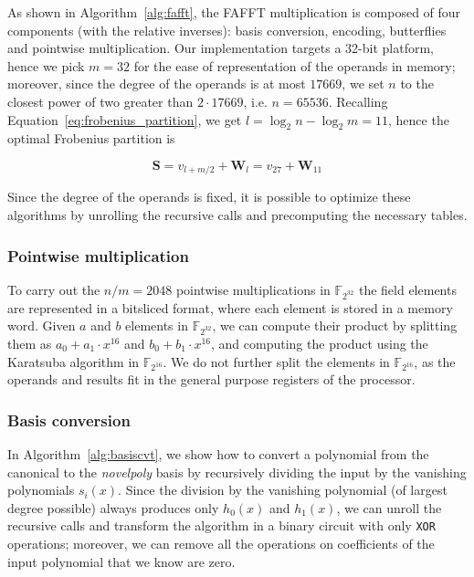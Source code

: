         As shown in Algorithm~\ref{alg:fafft}, the FAFFT multiplication is composed of four components (with the relative inverses): basis conversion, encoding, butterflies and
        pointwise multiplication.
        Our implementation targets a 32-bit platform, hence we pick $m=32$ for the ease of representation of the operands in memory; moreover,
        since the degree of the operands is at most $17669$, we set $n$ to the closest power of two greater than $2\cdot 17669$, i.e. $n=65536$.
        Recalling Equation~\ref{eq:frobenius_partition}, we get $l = \log_2{n}-\log_2{m} = 11$, hence the optimal Frobenius partition is
        
        \begin{equation*}
            \mathbf{S} = v_{l+m/2} + \mathbf{W}_l = v_{27} + \mathbf{W}_{11}
        \end{equation*}
        
        Since the degree of the operands is fixed, it is possible to optimize these algorithms by unrolling the recursive calls and precomputing the necessary tables.

    \subsubsection{Pointwise multiplication}
        To carry out the $n/m=2048$ pointwise multiplications in $\mathds{F}_{2^{32}}$ the field elements are represented in a bitsliced format,
        where each element is stored in a memory word. Given  $a$ and $b$ elements in $\mathds{F}_{2^{32}}$, we can compute their product
        by splitting them as $a_0 + a_1\cdot x^{16}$ and $b_0 + b_1\cdot x^{16}$, and computing the product using the Karatsuba
        algorithm in $\mathds{F}_{2^{16}}$. We do not further split the elements in $\mathds{F}_{2^{16}}$, as the operands and results fit in the
        general purpose registers of the processor.\\

    \subsubsection{Basis conversion}
        In Algorithm~\ref{alg:basiscvt}, we show how to convert a polynomial from the canonical to the \emph{novelpoly} basis by recursively
        dividing the input by the vanishing polynomials $s_i(x)$. Since the division by the vanishing polynomial (of largest degree possible) always produces only $h_0(x)$ and $h_1(x)$, 
        we can unroll the recursive calls and transform the algorithm in a binary circuit with only \texttt{XOR} operations; moreover, we can remove all the operations on coefficients
        of the input polynomial that we know are zero.

